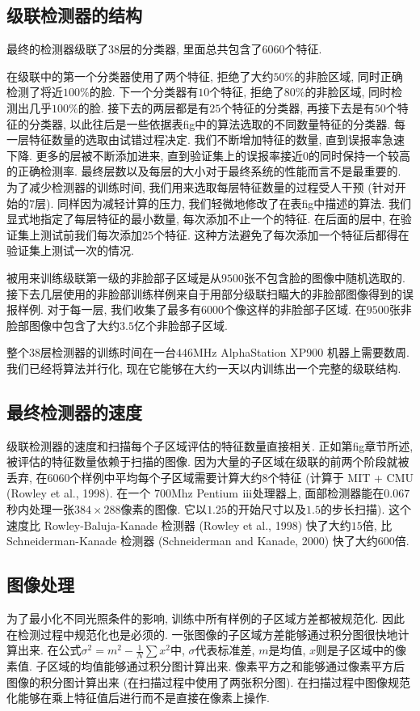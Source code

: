 \documentclass[a4paper,utf8,11pt, onecolumn]{ctexart}
\newcommand{\RN}[1]{%
  \textup{\uppercase\expandafter{\romannumeral#1}}%
}
\begin{document}
\subsection{级联检测器的结构}
最终的检测器级联了$38$层的分类器, 里面总共包含了$6060$个特征.

在级联中的第一个分类器使用了两个特征, 拒绝了大约$50\%$的非脸区域, 同时正确检测了将近$100\%$的脸. 下一个分类器有$10$个特征, 拒绝了$80\%$的非脸区域, 同时检测出几乎$100\%$的脸.
接下去的两层都是有$25$个特征的分类器, 再接下去是有$50$个特征的分类器, 以此往后是一些依据表fig中的算法选取的不同数量特征的分类器. 每一层特征数量的选取由试错过程决定. 我们不断增加特征的数量, 直到误报率急速下降. 更多的层被不断添加进来, 直到验证集上的误报率接近$0$的同时保持一个较高的正确检测率. 最终层数以及每层的大小对于最终系统的性能而言不是最重要的.
为了减少检测器的训练时间, 我们用来选取每层特征数量的过程受人干预 (针对开始的$7$层). 同样因为减轻计算的压力, 我们轻微地修改了在表fig中描述的算法. 我们显式地指定了每层特征的最小数量, 每次添加不止一个的特征. 在后面的层中, 在验证集上测试前我们每次添加$25$个特征.
这种方法避免了每次添加一个特征后都得在验证集上测试一次的情况.

被用来训练级联第一级的非脸部子区域是从$9500$张不包含脸的图像中随机选取的. 接下去几层使用的非脸部训练样例来自于用部分级联扫瞄大的非脸部图像得到的误报样例. 对于每一层, 我们收集了最多有$6000$个像这样的非脸部子区域. 在$9500$张非脸部图像中包含了大约$3.5$亿个非脸部子区域.

整个$38$层检测器的训练时间在一台$446$MHz AlphaStation XP900 机器上需要数周. 我们已经将算法并行化, 现在它能够在大约一天以内训练出一个完整的级联结构.

\subsection{最终检测器的速度}
级联检测器的速度和扫描每个子区域评估的特征数量直接相关. 正如第fig章节所述, 被评估的特征数量依赖于扫描的图像. 因为大量的子区域在级联的前两个阶段就被丢弃, 在$6060$个样例中平均每个子区域需要计算大约$8$个特征 (计算于 MIT + CMU (Rowley et al., 1998). 在一个 $700$Mhz Pentium $\RN{3}$处理器上, 面部检测器能在$0.067$秒内处理一张$384\times288$像素的图像. 它以$1.25$的开始尺寸以及$1.5$的步长扫描). 这个速度比 Rowley-Baluja-Kanade 检测器 (Rowley et al., 1998) 快了大约$15$倍, 比Schneiderman-Kanade 检测器 (Schneiderman and Kanade, 2000) 快了大约$600$倍.

\subsection{图像处理}
为了最小化不同光照条件的影响, 训练中所有样例的子区域方差都被规范化. 因此在检测过程中规范化也是必须的. 一张图像的子区域方差能够通过积分图很快地计算出来. 在公式$\sigma^2=m^2-\frac1N\sum x^2$中, $\sigma$代表标准差, $m$是均值, $x$则是子区域中的像素值. 子区域的均值能够通过积分图计算出来. 像素平方之和能够通过像素平方后图像的积分图计算出来 (在扫描过程中使用了两张积分图).
在扫描过程中图像规范化能够在乘上特征值后进行而不是直接在像素上操作.
\end{document}
